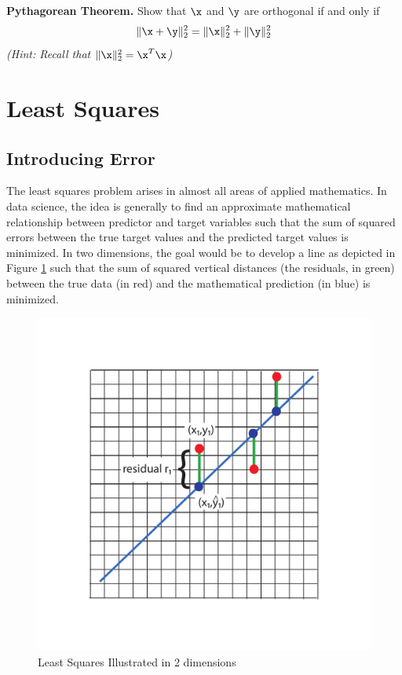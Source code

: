 \documentclass[
]{article}
\theoremstyle{definition}
\theoremstyle{definition}
\theoremstyle{definition}
\theoremstyle{definition}
\theoremstyle{remark}
\begin{document}
\textbf{Pythagorean Theorem.} Show that \(\x\) and \(\y\) are orthogonal if and only if
\[\|\x+\y\|_2^2 = \|\x\|_2^2 + \|\y\|_2^2\]
\emph{(Hint: Recall that \(\|\x\|_2^2 = \x^T\x\))}

\hypertarget{leastsquares}{%
\section{Least Squares}\label{leastsquares}}

\hypertarget{introducing-error}{%
\subsection{Introducing Error}\label{introducing-error}}

The least squares problem arises in almost all areas of applied mathematics. In data science, the idea is generally to find an approximate mathematical relationship between predictor and target variables such that the sum of squared errors between the true target values and the predicted target values is minimized. In two dimensions, the goal would be to develop a line as depicted in Figure \ref{fig:leastsquaresillustrated} such that the sum of squared vertical distances (the residuals, in green) between the true data (in red) and the mathematical prediction (in blue) is minimized.

\begin{figure}

{\centering \includegraphics{figs/lsreg} 

}

\caption{Least Squares Illustrated in 2 dimensions}\label{fig:leastsquaresillustrated}
\end{figure}
\end{document}
